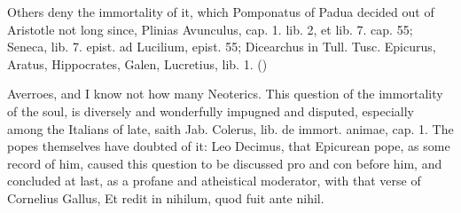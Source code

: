 {Others deny the immortality of it, which Pomponatus of Padua decided
out of Aristotle not long since, Plinias Avunculus, cap. 1. lib. 2, et
lib. 7. cap. 55; Seneca, lib. 7. epist. ad Lucilium, epist. 55;
Dicearchus in Tull. Tusc. Epicurus, Aratus, Hippocrates, Galen,
Lucretius, lib. 1.
()

Averroes, and I know not how many Neoterics. This question of the
immortality of the soul, is diversely and wonderfully impugned and
disputed, especially among the Italians of late, saith Jab. Colerus,
lib. de immort. animae, cap. 1. The popes themselves have doubted of
it: Leo Decimus, that Epicurean pope, as some record of him,
caused this question to be discussed pro and con before him, and
concluded at last, as a profane and atheistical moderator, with that
verse of Cornelius Gallus, Et redit in nihilum, quod fuit ante nihil.

}
